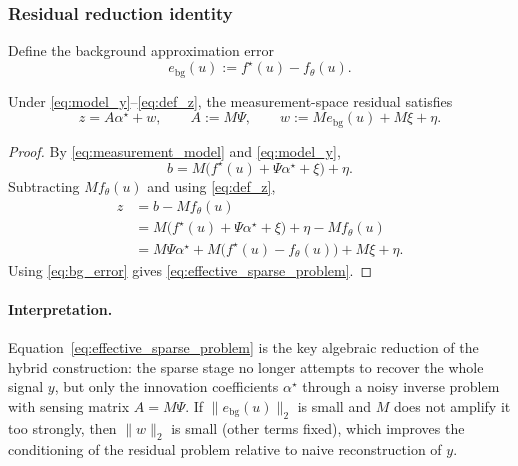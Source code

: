 \subsubsection{Residual reduction identity}

Define the background approximation error
\begin{equation}
  e_{\mathrm{bg}}(u) := f^\star(u) - f_\theta(u).
  \label{eq:bg_error}
\end{equation}

\begin{proposition}
\label{prop:residual_reduction_identity}
Under \eqref{eq:model_y}--\eqref{eq:def_z}, the measurement-space residual satisfies
\begin{equation}
  z = A\alpha^\star + w,
  \qquad
  A := M\Psi,
  \qquad
  w := M e_{\mathrm{bg}}(u) + M\xi + \eta.
  \label{eq:effective_sparse_problem}
\end{equation}
\end{proposition}

\begin{proof}
By \eqref{eq:measurement_model} and \eqref{eq:model_y},
\[
  b = M\bigl(f^\star(u) + \Psi\alpha^\star + \xi\bigr) + \eta.
\]
Subtracting $M f_\theta(u)$ and using \eqref{eq:def_z},
\begin{align*}
  z
  &= b - M f_\theta(u) \\
  &= M\bigl(f^\star(u) + \Psi\alpha^\star + \xi\bigr) + \eta - M f_\theta(u) \\
  &= M\Psi\alpha^\star + M\bigl(f^\star(u)-f_\theta(u)\bigr) + M\xi + \eta.
\end{align*}
Using \eqref{eq:bg_error} gives \eqref{eq:effective_sparse_problem}.
\end{proof}

\paragraph{Interpretation.}
Equation~\eqref{eq:effective_sparse_problem} is the key algebraic reduction of the hybrid construction: the sparse stage no longer attempts to recover the whole signal $y$, but only the innovation coefficients $\alpha^\star$ through a noisy inverse problem with sensing matrix $A=M\Psi$.
If $\|e_{\mathrm{bg}}(u)\|_2$ is small and $M$ does not amplify it too strongly, then $\|w\|_2$ is small (other terms fixed), which improves the conditioning of the residual problem relative to naive reconstruction of $y$.

